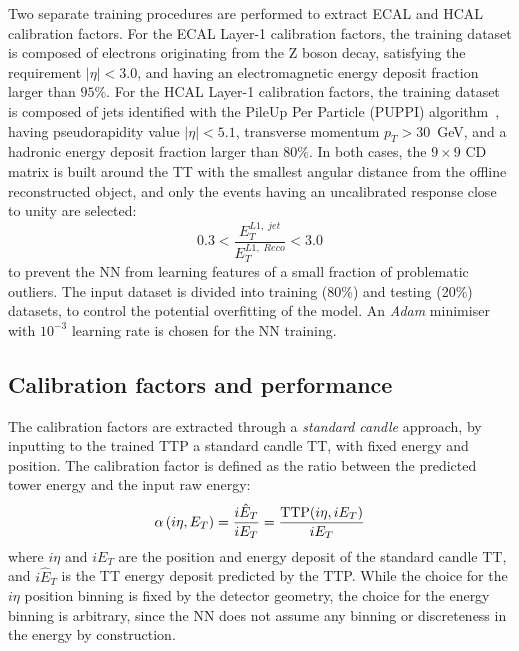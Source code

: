 Two separate training procedures are performed to extract ECAL and HCAL calibration factors. For the ECAL Layer-1 calibration factors, the training dataset is composed of electrons originating from the Z boson decay, satisfying the requirement $|\eta| < 3.0$, and having an electromagnetic energy deposit fraction larger than $95\%$.
For the HCAL Layer-1 calibration factors, the training dataset is composed of jets identified with the PileUp Per Particle (PUPPI) algorithm~\cite{PUPPI_2014}, having pseudorapidity value $|\eta| < 5.1$, transverse momentum $p_T>30$~GeV, and a hadronic energy deposit fraction larger than $80\%$.
In both cases, the $9\times9$ CD matrix is built around the TT with the smallest angular distance from the offline reconstructed object, and only the events having an uncalibrated response close to unity are selected:
\begin{equation}
    0.3 < \frac{E_T^{L1,\;jet}}{E_T^{L1,\;Reco}} < 3.0
\end{equation}
to prevent the NN from learning features of a small fraction of problematic outliers.
The input dataset is divided into training (80\%) and testing (20\%) datasets, to control the potential overfitting of the model.
An \textit{Adam} minimiser~\cite{ADAM_2017} with $10^{-3}$ learning rate is chosen for the NN training.


\subsection{Calibration factors and performance}

The calibration factors are extracted through a \textit{standard candle} approach, by inputting to the trained TTP a standard candle TT, with fixed energy and position. The calibration factor is defined as the ratio between the predicted tower energy and the input raw energy:
\begin{equation}
    \alpha\,(i\eta,E_{T}) = \frac{i\hat{E}_T}{iE_T} = \frac{\textnormal{TTP}(i\eta,iE_T)}{iE_T}
\end{equation}
where $i\eta$ and $iE_T$ are the position and energy deposit of the standard candle TT, and $i\hat{E}_T$ is the TT energy deposit predicted by the TTP.
While the choice for the $i\eta$ position binning is fixed by the detector geometry, the choice for the energy binning is arbitrary, since the NN does not assume any binning or discreteness in the energy by construction. 

